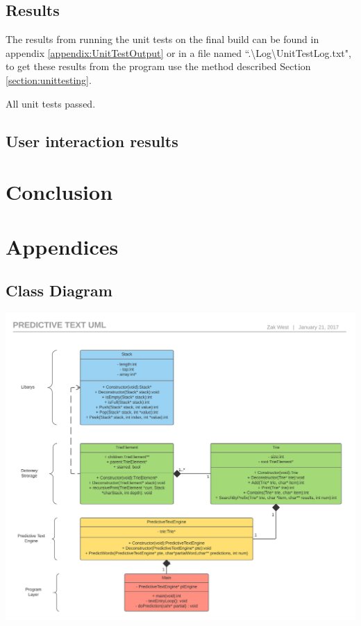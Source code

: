 \documentclass[10pt]{article} %
\begin{document}
            \subsection{Results}
			     The results from running the unit tests on the final build can be found in appendix \ref{appendix:UnitTestOutput} or in a file named ``.\textbackslash Log\textbackslash UnitTestLog.txt", to get these results from the program use the method described Section \ref{section:unittesting}.
			     
			     All unit tests passed.
			     
			\subsection{User interaction results}
            
    \section{Conclusion}
	\newpage
	\printbibliography
	\newpage
	
    \appendix
    \section*{Appendices}
    \renewcommand{\thesubsection}{\Alph{subsection}}

    \subsection{Class Diagram}
        \includegraphics[width=\textwidth]{PredictiveTextUML}
\end{document}
